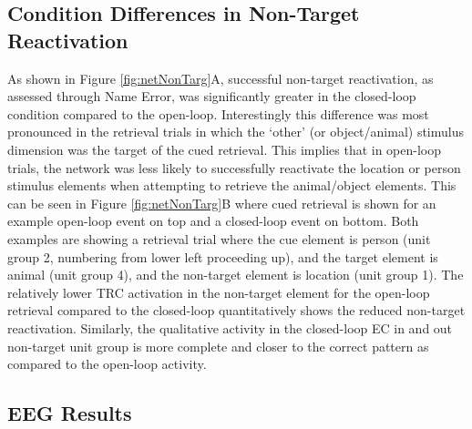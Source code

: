 \documentclass[11pt, titlepage, twoside]{article}
\begin{document}
\subsection{Condition Differences in Non-Target Reactivation}
As shown in Figure \ref{fig:netNonTarg}A, successful non-target reactivation, as assessed through Name Error, was significantly greater in the closed-loop condition compared to the open-loop.  Interestingly this difference was most pronounced in the retrieval trials in which the `other' (or object/animal) stimulus dimension was the target of the cued retrieval.  This implies that in open-loop trials, the network was less likely to successfully reactivate  the location or person stimulus elements when attempting to retrieve the animal/object elements.  This can be seen in Figure \ref{fig:netNonTarg}B where cued retrieval is shown for an example open-loop event on top and a closed-loop event on bottom.  Both examples are showing a retrieval trial where the cue element is person (unit group 2, numbering from lower left proceeding up), and the target element is animal (unit group 4), and the non-target element is location (unit group 1).  The relatively lower TRC activation in the non-target element for the open-loop retrieval compared to the closed-loop quantitatively shows the reduced non-target reactivation.  Similarly, the qualitative activity in the closed-loop EC in and out non-target unit group is more complete and closer to the correct pattern as compared to the open-loop activity.


\subsection{EEG Results}\label{sec:eegresults}
\end{document}
